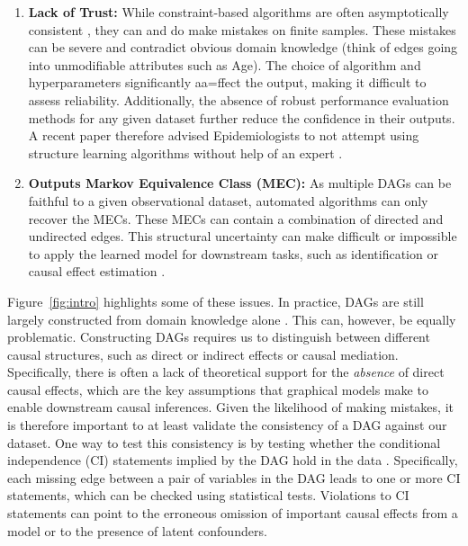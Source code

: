 \documentclass{uai2025} %
\begin{document}
\begin{enumerate}
	\item \textbf{Lack of Trust:} While constraint-based algorithms are 
		often asymptotically
		consistent \citep{KalischB07}, they can and do make mistakes
		on  finite samples. These mistakes can be severe and contradict
		obvious domain knowledge (think of edges going into unmodifiable
		attributes such as Age). The choice of algorithm and hyperparameters
		significantly aa=ffect the output, making it
		difficult to assess reliability. Additionally, the absence of
		robust performance evaluation methods for any given dataset
		further reduce the confidence in their outputs. A recent paper
		therefore advised Epidemiologists to not attempt using structure
		learning algorithms without help of an expert \citep{Gururaghavendran_2024}.
	\item \textbf{Outputs Markov Equivalence Class (MEC):} As multiple
		DAGs can be faithful to a given observational dataset, automated 
		algorithms can only recover the MECs. These MECs can contain a
		combination of directed and undirected edges. This structural uncertainty
		can make difficult or impossible to apply the learned model for downstream
		tasks, such as identification or causal
		effect estimation \citep{Maathuis_2009,PerkovicTKM17}.
\end{enumerate}

Figure~\ref{fig:intro} highlights some of these issues. In practice, DAGs 
are still largely constructed from domain knowledge alone 
\citep{Tennant2020,Petersen2021}. This can, however, be equally problematic.
Constructing DAGs requires us to distinguish between different causal structures, 
such as direct or indirect effects or causal mediation. Specifically, there is often a lack
of theoretical support for the \emph{absence} of direct causal effects, which are 
the key assumptions that graphical models make to enable downstream causal inferences.
Given the likelihood of making mistakes, it is therefore
important to at least validate the consistency of a DAG against our dataset. One way to
test this consistency is by testing whether the conditional independence 
(CI) statements implied by the DAG hold in the data \citep{Ankan2021}. Specifically, 
each missing edge between
a pair of variables in the DAG leads to one or more CI statements, 
which can be checked using statistical tests. Violations to CI
statements can point to the erroneous omission of important causal effects from a model
or to the presence of latent confounders.
\end{document}
